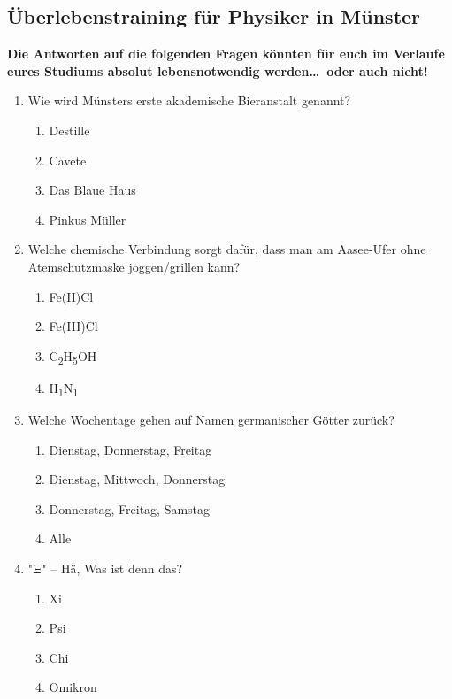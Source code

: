\subsection*{Überlebenstraining für Physiker in Münster}
\begin{multicols}{2}
\textbf{Die Antworten auf die folgenden Fragen könnten für euch im Verlaufe eures Studiums absolut lebensnotwendig werden\dots\ oder auch nicht!}

\begin{enumerate}[font=\large, before=\large]
\item Wie wird Münsters erste akademische Bieranstalt genannt?
	\begin{enumerate}[label=\alph*), before=\normalsize]
	\item Destille
	\item Cavete
	\item Das Blaue Haus
	\item Pinkus Müller
	\end{enumerate}
\item Welche chemische Verbindung sorgt dafür, dass man am Aasee-Ufer ohne Atemschutzmaske joggen/grillen kann?
	\begin{enumerate}[label=\alph*), before=\normalsize]
	\item Fe(II)Cl
	\item Fe(III)Cl
	\item C\textsubscript{2}H\textsubscript{5}OH
	\item H\textsubscript{1}N\textsubscript{1}
	\end{enumerate}
\item Welche Wochentage gehen auf Namen germanischer Götter zurück?
	\begin{enumerate}[label=\alph*), before=\normalsize]
	\item Dienstag, Donnerstag, Freitag
	\item Dienstag, Mittwoch, Donnerstag
	\item Donnerstag, Freitag, Samstag
	\item Alle
	\end{enumerate}
\item "$\Xi$" -- Hä, Was ist denn das?
	\begin{enumerate}[label=\alph*), before=\normalsize]
	\item Xi
	\item Psi
	\item Chi
	\item Omikron
	\end{enumerate}

\end{enumerate}
\end{multicols}
